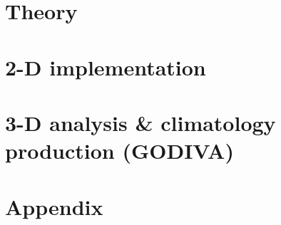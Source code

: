 



\nocite{*} 				%
\frontmatter


\pagestyle{plain}




\dominitoc
\setcounter{tocdepth}{1}
\tableofcontents

\mainmatter
\pagestyle{fancy}



\thispagestyle{empty}
\part{\diva Theory\label{part:theory}}









\thispagestyle{empty}
\part{2-D implementation\label{part:2Dimplementation}}









\thispagestyle{empty}

\part{3-D analysis \& climatology production (GODIVA)\label{part:godiva}}







\thispagestyle{empty}
\part{Appendix\label{part:appendix}}
\appendix




\pagestyle{plain}





\listoffigures
\listoftables
\printindex


	
	
